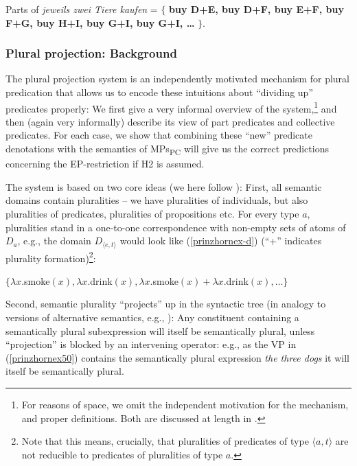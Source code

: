\documentclass[output=paper,colorlinks,citecolor=brown,
]{langscibook}
\begin{document}
\ea 
Parts of \textit{jeweils zwei Tiere kaufen} = $\{$ \textbf{buy D+E, buy D+F, buy E+F,  buy F+G, buy H+I, buy G+I, buy G+I, \dots} $\}$.\label{prinzhornex46c}
\z

\subsubsection{Plural projection: Background}\label{prinzhornsec:4.2.1}

The plural projection system \citep{Schmitt:2019, Haslinger:2018a, Haslinger:2018b} is an independently motivated mechanism for plural predication that allows us to encode these intuitions about “dividing up” predicates properly: We first give a very informal overview of the system,\footnote{For reasons of space, we omit the independent motivation for the mechanism, and proper definitions. Both are discussed at length in \citealt{Schmitt:2019, Haslinger:2018a, Haslinger:2018b}.} and then (again very informally) describe its view of part predicates and collective predicates. For each case, we show that combining these “new” predicate denotations with the semantics of MPs\textsubscript{PC} will give us the correct predictions concerning the EP-restriction if H2 is assumed.



The system  is based on two core ideas (we here follow \cite{Haslinger:2018b}): First, all semantic domains contain pluralities -- we have pluralities of individuals, but also pluralities of predicates, pluralities of propositions etc. For every type $a$, pluralities stand in a one-to-one correspondence with non-empty sets of atoms of $D_{a}$, e.g., the domain $D_{\langle e,t \rangle}$ would look like (\ref{prinzhornex-d}) (“+” indicates plurality formation)\footnote{Note that this means, crucially, that pluralities of predicates of type $\langle a,t \rangle$ are not reducible to predicates of  pluralities of type $a$.}: 



\ea	 $\{ \lambda x. $smoke$(x), \lambda x. $drink$(x), \lambda x. $smoke$(x) + \lambda x.  $drink$(x), \dots\}$ \label{prinzhornex-d} \z

Second, semantic plurality “projects” up in the syntactic tree (in analogy to versions of alternative semantics, e.g., \citealt{Rooth:1985}):
 Any constituent containing a semantically plural subexpression will itself be semantically plural, unless “projection”  is blocked by an intervening operator: e.g., as the VP in (\ref{prinzhornex50}) contains the semantically plural expression \textit{the three dogs} it will itself be semantically plural.
 
\end{document}
